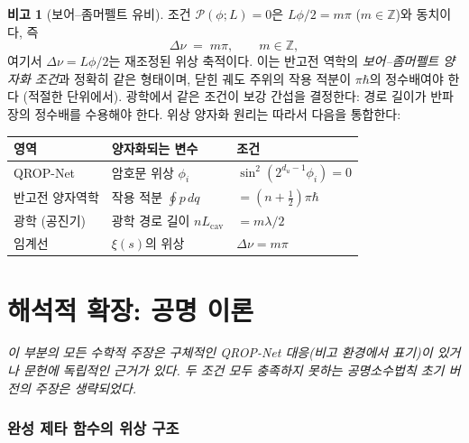 \documentclass[11pt, a4paper]{article}
\theoremstyle{definition}
\newtheorem{remark}{비고}[section]
\theoremstyle{plain}
\newcommand{\xif}{\xi}
\begin{document}
\begin{remark}[보어--좀머펠트 유비]
\label{rem:bohr_sommerfeld}
조건 $\mathcal{P}(\phi; L) = 0$은 $L\phi/2 = m\pi$ ($m \in \mathbb{Z}$)와 동치이다, 즉
\begin{equation}
  \Delta\nu \;=\; m\pi, \qquad m \in \mathbb{Z},
  \label{eq:bohr_sommerfeld}
\end{equation}
여기서 $\Delta\nu = L\phi/2$는 재조정된 위상 축적이다. 이는 반고전 역학의 \textit{보어--좀머펠트 양자화 조건}과 정확히 같은 형태이며, 닫힌 궤도 주위의 작용 적분이 $\pi\hbar$의 정수배여야 한다 (적절한 단위에서). 광학에서 같은 조건이 보강 간섭을 결정한다: 경로 길이가 반파장의 정수배를 수용해야 한다. 위상 양자화 원리는 따라서 다음을 통합한다:
\begin{center}
\begin{tabular}{lll}
\toprule
\textbf{영역} & \textbf{양자화되는 변수} & \textbf{조건} \\
\midrule
QROP-Net       & 암호문 위상 $\phi_i$
                & $\sin^2(2^{d_u-1}\phi_i) = 0$ \\
반고전 양자역학 & 작용 적분 $\oint p\,dq$
                & $= (n + \tfrac{1}{2})\pi\hbar$ \\
광학 (공진기)   & 광학 경로 길이 $nL_{\mathrm{cav}}$
                & $= m\lambda/2$ \\
임계선          & $\xif(s)$의 위상
                & $\Delta\nu = m\pi$ \\
\bottomrule
\end{tabular}
\end{center}
\end{remark}



\part{해석적 확장: 공명 이론}
\label{part:resonance}

\vspace{0.5em}
\noindent\textit{이 부분의 모든 수학적 주장은 구체적인 QROP-Net 대응(비고 환경에서 표기)이 있거나 문헌에 독립적인 근거가 있다. 두 조건 모두 충족하지 못하는 공명소수법칙 초기 버전의 주장은 생략되었다.}
\vspace{0.5em}


\section{완성 제타 함수의 위상 구조}
\label{sec:xi_phase}
\end{document}
